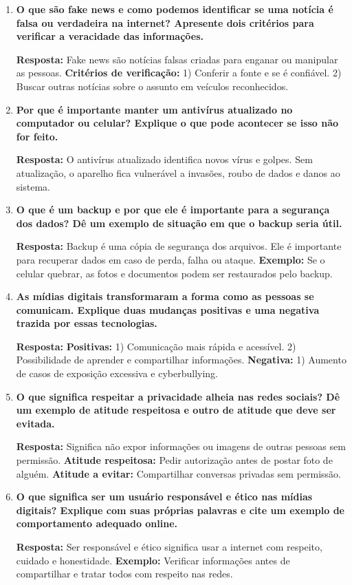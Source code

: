 \documentclass[11pt]{article}
\begin{document}
\begin{enumerate}
\item \textbf{O que são fake news e como podemos identificar se uma notícia é falsa ou verdadeira na internet?  
Apresente dois critérios para verificar a veracidade das informações.}  

\textbf{Resposta:}  
Fake news são notícias falsas criadas para enganar ou manipular as pessoas.  
\textbf{Critérios de verificação:}  
1) Conferir a fonte e se é confiável.  
2) Buscar outras notícias sobre o assunto em veículos reconhecidos.

\item \textbf{Por que é importante manter um antivírus atualizado no computador ou celular?  
Explique o que pode acontecer se isso não for feito.}  

\textbf{Resposta:}  
O antivírus atualizado identifica novos vírus e golpes.  
Sem atualização, o aparelho fica vulnerável a invasões, roubo de dados e danos ao sistema.

\item \textbf{O que é um backup e por que ele é importante para a segurança dos dados?  
Dê um exemplo de situação em que o backup seria útil.}  

\textbf{Resposta:}  
Backup é uma cópia de segurança dos arquivos. Ele é importante para recuperar dados em caso de perda, falha ou ataque.  
\textbf{Exemplo:} Se o celular quebrar, as fotos e documentos podem ser restaurados pelo backup.

\item \textbf{As mídias digitais transformaram a forma como as pessoas se comunicam.  
Explique duas mudanças positivas e uma negativa trazida por essas tecnologias.}  

\textbf{Resposta:}  
\textbf{Positivas:}  
1) Comunicação mais rápida e acessível.  
2) Possibilidade de aprender e compartilhar informações.  
\textbf{Negativa:}  
1) Aumento de casos de exposição excessiva e cyberbullying.

\item \textbf{O que significa respeitar a privacidade alheia nas redes sociais?  
Dê um exemplo de atitude respeitosa e outro de atitude que deve ser evitada.}  

\textbf{Resposta:}  
Significa não expor informações ou imagens de outras pessoas sem permissão.  
\textbf{Atitude respeitosa:} Pedir autorização antes de postar foto de alguém.  
\textbf{Atitude a evitar:} Compartilhar conversas privadas sem permissão.

\item \textbf{O que significa ser um usuário responsável e ético nas mídias digitais?  
Explique com suas próprias palavras e cite um exemplo de comportamento adequado online.}  

\textbf{Resposta:}  
Ser responsável e ético significa usar a internet com respeito, cuidado e honestidade.  
\textbf{Exemplo:} Verificar informações antes de compartilhar e tratar todos com respeito nas redes.

\end{enumerate}
\end{document}
